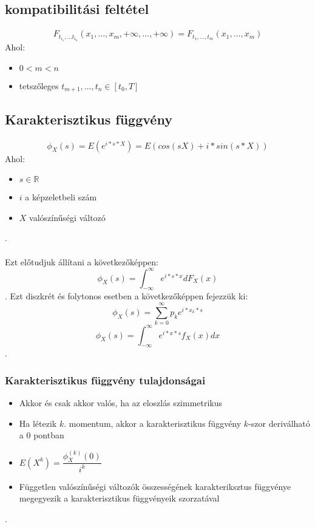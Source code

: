 \documentclass[11pt,a4paper]{article}
\begin{document}
			\subsection{kompatibilitási feltétel}
				\paragraph{}
					$$F_{t_{i_1},\dots t_{i_n}}(x_1, \dots, x_m, +\infty, \dots, +\infty) = F_{t_1, \dots,t_m}(x_1, \dots, x_m)$$
					Ahol:
					\begin{itemize}
						\item $0< m < n$
						\item tetszőleges $t_{m+1}, \dots , t_n \in [t_0,T]$
					\end{itemize}

			\subsection{Karakterisztikus függvény}
				\paragraph{}
					$$\phi_X(s) = E(e^{i*s*X}) = E(cos(sX) + i*sin(s*X))$$
					Ahol:
					\begin{itemize}
						\item $s \in \mathbb{R}$
						\item $i$ a képzeletbeli szám
						\item $X$ valószínűségi változó
					\end{itemize}.
				\paragraph{}
					Ezt előtudjuk állítani a következőképpen:
					$$\phi_X(s) = \int_{- \infty}^\infty e^{i*s*x} dF_X (x)$$.
					Ezt diszkrét és folytonos esetben a következőképpen fejezzük ki:
					$$\phi_X (s) = \sum_{k=0}^\infty p_k e^{i* x_k*s}$$
					$$\phi_X(s) = \int_{- \infty}^\infty e^{i*x*s} f_X(x)dx$$.
				\subsubsection{Karakterisztikus függvény tulajdonságai}
					\begin{itemize}
						\item Akkor és csak akkor valós, ha az eloszlás szimmetrikus
						\item Ha létezik $k$. momentum, akkor a karakterisztikus függvény $k$-szor deriválható a $0$ pontban
						\item $E(X^k) = \dfrac{\phi_X^{(k)} (0)}{i^k}$
						\item Független valószínűségi változók összességének karakteriksztus függvénye megegyezik a karakterisztikus függvényeik szorzatával
					\end{itemize}.
\end{document}

